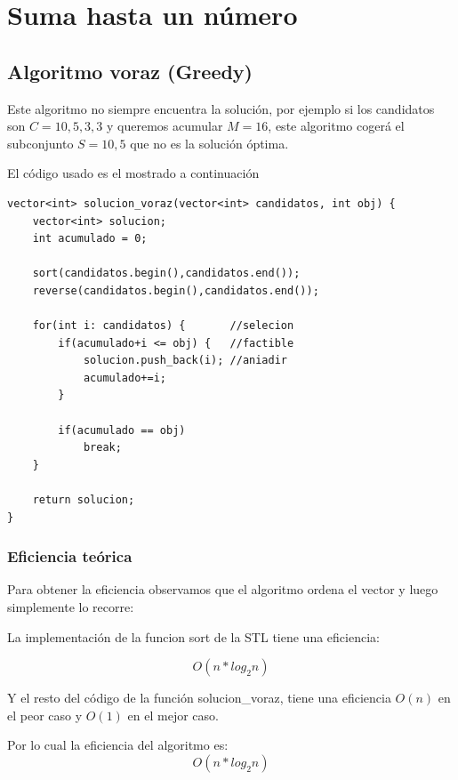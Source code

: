 \section{Suma hasta un número}

\subsection{Algoritmo voraz (Greedy)}

Este algoritmo no siempre encuentra la solución, por ejemplo si los candidatos son $ C = { 10 , 5 , 3 , 3 }  $ y queremos acumular $ M = 16 $,
este algoritmo cogerá el subconjunto $ S = { 10, 5} $ que no es la solución óptima.


El código usado es el mostrado a continuación

\begin{lstlisting}
vector<int> solucion_voraz(vector<int> candidatos, int obj) {
    vector<int> solucion;
    int acumulado = 0;

    sort(candidatos.begin(),candidatos.end());
    reverse(candidatos.begin(),candidatos.end());

    for(int i: candidatos) {       //selecion
        if(acumulado+i <= obj) {   //factible
            solucion.push_back(i); //aniadir
            acumulado+=i; 
        }

        if(acumulado == obj)
            break;
    }

    return solucion;
}
\end{lstlisting}

\subsubsection{Eficiencia teórica}

 Para obtener la eficiencia observamos que el algoritmo ordena el vector y luego simplemente lo recorre:
 
 La implementación de la funcion sort de la STL tiene una eficiencia:

  \begin{equation}
      O(n*log_2{n})
  \end{equation}

Y el resto del código de la función solucion\_voraz, tiene una eficiencia $ O(n) $ en el peor caso y $ O(1) $ en el mejor caso.

Por lo cual la eficiencia del algoritmo es:
 \begin{equation}
      O(n*log_2{n})
  \end{equation}

